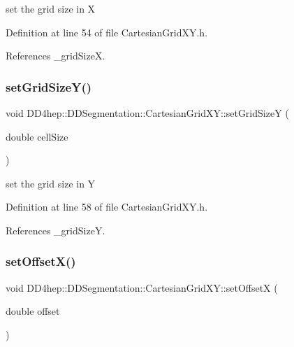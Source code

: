 set the grid size in X 



Definition at line 54 of file Cartesian\+Grid\+X\+Y.\+h.



References \+\_\+grid\+SizeX.

\hypertarget{class_d_d4hep_1_1_d_d_segmentation_1_1_cartesian_grid_x_y_ab824e8c12fa4314119994f7f54e134cf}{}\label{class_d_d4hep_1_1_d_d_segmentation_1_1_cartesian_grid_x_y_ab824e8c12fa4314119994f7f54e134cf} 
\subsubsection{\texorpdfstring{set\+Grid\+Size\+Y()}{setGridSizeY()}}
{\footnotesize\ttfamily void D\+D4hep\+::\+D\+D\+Segmentation\+::\+Cartesian\+Grid\+X\+Y\+::set\+Grid\+SizeY (\begin{DoxyParamCaption}\item[{double}]{cell\+Size }\end{DoxyParamCaption})\hspace{0.3cm}{\ttfamily [inline]}}



set the grid size in Y 



Definition at line 58 of file Cartesian\+Grid\+X\+Y.\+h.



References \+\_\+grid\+SizeY.

\hypertarget{class_d_d4hep_1_1_d_d_segmentation_1_1_cartesian_grid_x_y_acc939312a216a3182eba69a024049663}{}\label{class_d_d4hep_1_1_d_d_segmentation_1_1_cartesian_grid_x_y_acc939312a216a3182eba69a024049663} 
\subsubsection{\texorpdfstring{set\+Offset\+X()}{setOffsetX()}}
{\footnotesize\ttfamily void D\+D4hep\+::\+D\+D\+Segmentation\+::\+Cartesian\+Grid\+X\+Y\+::set\+OffsetX (\begin{DoxyParamCaption}\item[{double}]{offset }\end{DoxyParamCaption})\hspace{0.3cm}{\ttfamily [inline]}}



